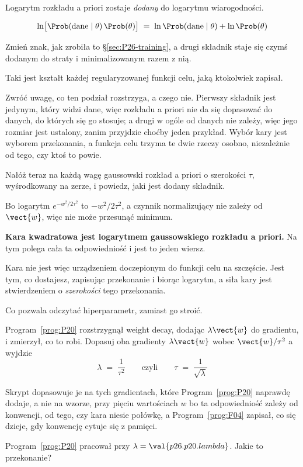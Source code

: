 \begin{fr}
\begin{ansblock}
Logarytm rozkładu a priori zostaje \emph{dodany} do logarytmu wiarogodności.
\end{ansblock}

\[ \ln\bigl[\Prob(\text{dane} \mid \theta)\,\Prob(\theta)\bigr]
   \;=\; \ln \Prob(\text{dane} \mid \theta) + \ln \Prob(\theta) \]

Zmień znak, jak zrobiła to \S\ref{sec:P26-training}, a drugi składnik staje
się czymś dodanym do straty i minimalizowanym razem z nią.

Taki jest kształt każdej regularyzowanej funkcji celu, jaką ktokolwiek
zapisał.

Zwróć uwagę, co ten podział rozstrzyga, a czego nie. Pierwszy składnik jest
jedynym, który widzi dane, więc rozkładu a priori nie da się dopasować do
danych, do których się go stosuje; a drugi w ogóle od danych nie zależy, więc
jego rozmiar jest ustalony, zanim przyjdzie choćby jeden przykład. Wybór kary
jest wyborem przekonania, a funkcja celu trzyma te dwie rzeczy osobno,
niezależnie od tego, czy ktoś to powie.

Nałóż teraz na każdą wagę gaussowski rozkład a priori o szerokości $\tau$,
wyśrodkowany na zerze, i powiedz, jaki jest dodany składnik.
\dotline
\nextframe
\end{fr}

\begin{fr}

Bo logarytm $e^{-w^{2}/2\tau^{2}}$ to $-w^{2}/2\tau^{2}$, a czynnik
normalizujący nie zależy od $\vect{w}$, więc nie może przesunąć minimum.

\textbf{Kara kwadratowa jest logarytmem gaussowskiego rozkładu a priori.} Na
tym polega cała ta odpowiedniość i jest to jeden wiersz.

Kara nie jest więc urządzeniem doczepionym do funkcji celu na szczęście. Jest
tym, co dostajesz, zapisując przekonanie i biorąc logarytm, a siła kary jest
stwierdzeniem o \emph{szerokości} tego przekonania.
\end{fr}

\begin{fr}
Co pozwala odczytać hiperparametr, zamiast go stroić.

Program~\ref{prog:P20} rozstrzygnął weight decay, dodając $\lambda\vect{w}$
do gradientu, i zmierzył, co to robi. Dopasuj oba gradienty \dash{}
$\lambda\vect{w}$ wobec $\vect{w}/\tau^{2}$ \dash{} a wyjdzie
\[ \lambda \;=\; \frac{1}{\tau^{2}}
   \qquad\text{czyli}\qquad \tau \;=\; \frac{1}{\sqrt{\lambda}} \]

Skrypt dopasowuje je na tych gradientach, które Program~\ref{prog:P20}
naprawdę dodaje, a nie na wzorze, przy pięciu wartościach $w$ \dash{} bo ta
odpowiedniość zależy od konwencji, od tego, czy kara niesie połówkę, a
Program~\ref{prog:F04} zapisał, co się dzieje, gdy konwencję cytuje się z
pamięci.

Program~\ref{prog:P20} pracował przy $\lambda = \val{p26.p20.lambda}$. Jakie
to przekonanie?
\dotline
\nextframe
\end{fr}

